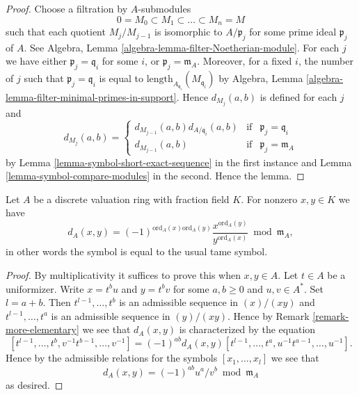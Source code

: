 \begin{proof}
Choose a filtration by $A$-submodules
$$
0 = M_0 \subset M_1 \subset \ldots \subset M_n = M
$$
such that each quotient $M_j/M_{j - 1}$ is isomorphic
to $A/\mathfrak p_j$ for some prime ideal $\mathfrak p_j$
of $A$. See Algebra, Lemma \ref{algebra-lemma-filter-Noetherian-module}.
For each $j$ we have either $\mathfrak p_j = \mathfrak q_i$
for some $i$, or $\mathfrak p_j = \mathfrak m_A$. Moreover,
for a fixed $i$, the number of $j$ such that
$\mathfrak p_j = \mathfrak q_i$ is equal to
$\text{length}_{A_{\mathfrak q_i}}(M_{\mathfrak q_i})$ by
Algebra, Lemma \ref{algebra-lemma-filter-minimal-primes-in-support}.
Hence $d_{M_j}(a, b)$ is defined for each $j$ and
$$
d_{M_j}(a, b)
=
\left\{
\begin{matrix}
d_{M_{j - 1}}(a, b) d_{A/\mathfrak q_i}(a, b) &
\text{if} & \mathfrak p_j = \mathfrak q_i \\
d_{M_{j - 1}}(a, b) & \text{if} & \mathfrak p_j = \mathfrak m_A
\end{matrix}
\right.
$$
by Lemma \ref{lemma-symbol-short-exact-sequence} in the first instance
and Lemma \ref{lemma-symbol-compare-modules} in the second. Hence the lemma.
\end{proof}

\begin{lemma}
\label{lemma-symbol-is-usual-tame-symbol}
Let $A$ be a discrete valuation ring with fraction field $K$.
For nonzero $x, y \in K$ we have
$$
d_A(x, y)
=
(-1)^{\text{ord}_A(x)\text{ord}_A(y)}
\frac{x^{\text{ord}_A(y)}}{y^{\text{ord}_A(x)}} \bmod \mathfrak m_A,
$$
in other words the symbol is equal to the usual tame symbol.
\end{lemma}

\begin{proof}
By multiplicativity it suffices to prove this when $x, y \in A$.
Let $t \in A$ be a uniformizer.
Write $x = t^bu$ and $y = t^bv$ for some $a, b \geq 0$
and $u, v \in A^*$. Set $l = a + b$. Then
$t^{l - 1}, \ldots, t^b$ is an admissible sequence in
$(x)/(xy)$ and $t^{l - 1}, \ldots, t^a$ is an admissible
sequence in $(y)/(xy)$. Hence by Remark \ref{remark-more-elementary}
we see that $d_A(x, y)$ is characterized by the equation
$$
[t^{l - 1}, \ldots, t^b, v^{-1}t^{b - 1}, \ldots, v^{-1}]
=
(-1)^{ab} d_A(x, y)
[t^{l - 1}, \ldots, t^a, u^{-1}t^{a - 1}, \ldots, u^{-1}].
$$
Hence by the admissible relations for the
symbols $[x_1, \ldots, x_l]$ we see that
$$
d_A(x, y) = (-1)^{ab} u^a/v^b \bmod \mathfrak m_A
$$
as desired.
\end{proof}


